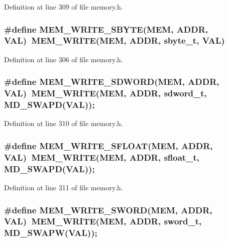 Definition at line 309 of file memory.h.
\subsubsection[{MEM\_\-WRITE\_\-SBYTE}]{\setlength{\rightskip}{0pt plus 5cm}\#define MEM\_\-WRITE\_\-SBYTE(MEM, \/  ADDR, \/  VAL)~MEM\_\-WRITE(MEM, ADDR, {\bf sbyte\_\-t}, VAL)}\label{memory_8h_8ee284de1eb9b6f435752a3a17eb9755}




Definition at line 306 of file memory.h.
\subsubsection[{MEM\_\-WRITE\_\-SDWORD}]{\setlength{\rightskip}{0pt plus 5cm}\#define MEM\_\-WRITE\_\-SDWORD(MEM, \/  ADDR, \/  VAL)~MEM\_\-WRITE(MEM, ADDR, {\bf sdword\_\-t}, MD\_\-SWAPD(VAL));}\label{memory_8h_ada0fda16a4e39b7f4f4e8057ab87f9f}




Definition at line 310 of file memory.h.
\subsubsection[{MEM\_\-WRITE\_\-SFLOAT}]{\setlength{\rightskip}{0pt plus 5cm}\#define MEM\_\-WRITE\_\-SFLOAT(MEM, \/  ADDR, \/  VAL)~MEM\_\-WRITE(MEM, ADDR, {\bf sfloat\_\-t}, MD\_\-SWAPD(VAL));}\label{memory_8h_b4d509a26e8c65c9e57c97a924b74156}




Definition at line 311 of file memory.h.
\subsubsection[{MEM\_\-WRITE\_\-SWORD}]{\setlength{\rightskip}{0pt plus 5cm}\#define MEM\_\-WRITE\_\-SWORD(MEM, \/  ADDR, \/  VAL)~MEM\_\-WRITE(MEM, ADDR, {\bf sword\_\-t}, MD\_\-SWAPW(VAL));}\label{memory_8h_1aa3f5f5b1649e050852f0d58d5f3256}




